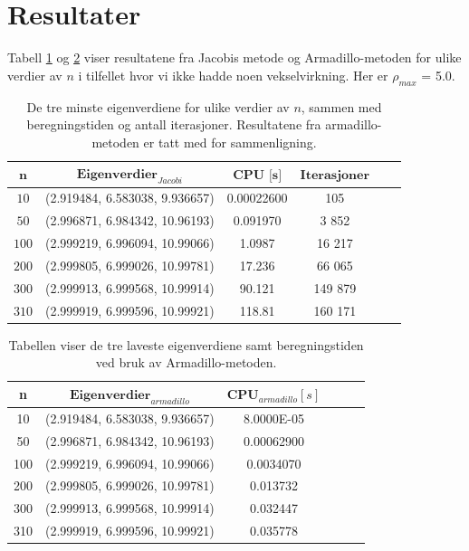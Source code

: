 \documentclass{article}
\begin{document}
\section{Resultater}
Tabell \ref{tab:jacobi} og \ref{tab:armadillo} viser resultatene fra Jacobis metode og Armadillo-metoden for ulike verdier av $n$ i tilfellet hvor vi ikke hadde noen vekselvirkning. Her er $\rho_{max}$ = 5.0.

\FloatBarrier
\begin{table}[!ht]
\centering
\caption{De tre minste eigenverdiene for ulike verdier av $n$, sammen med beregningstiden og antall iterasjoner. Resultatene fra armadillo-metoden er tatt med for sammenligning.}
\label{tab:jacobi}
\begin{tabular}{|c|c|c|c|c|c|}
\hline
$\textbf{n}$      &  $\textbf{Eigenverdier}_{Jacobi}$ & $\textbf{CPU [s]}$ & $\textbf{Iterasjoner}$ \\ 
\hline
$10$     & (2.919484, 6.583038, 9.936657) &  0.00022600 & 105               \\ 
\hline
$50$ & (2.996871, 6.984342, 10.96193)     & 0.091970     & 3 852             \\ 
\hline
$100$ & (2.999219, 6.996094, 10.99066)     & 1.0987      & 16 217         \\ 
\hline
$200$ & (2.999805, 6.999026, 10.99781)     & 17.236     & 66 065             \\ 
\hline
$300$ & (2.999913, 6.999568, 10.99914)     & 90.121    & 149 879               \\ 
\hline
$310$ & (2.999919, 6.999596, 10.99921)     &  118.81   & 160 171     \\ 
\hline       
\end{tabular}
\end{table}
\FloatBarrier

\FloatBarrier
\begin{table}[!ht]
\centering
\caption{Tabellen viser de tre laveste eigenverdiene samt beregningstiden ved bruk av Armadillo-metoden.}
\label{tab:armadillo}
\begin{tabular}{|c|c|c|c|c|c|}
\hline
\textbf{n}     &  $\textbf{Eigenverdier}_{armadillo}$  &  $\textbf{CPU}_{armadillo} [s]$  \\ 
\hline
10     & (2.919484,   6.583038,   9.936657)  &8.0000E-05     \\ 
\hline
50 & (2.996871, 6.984342, 10.96193)  &     0.00062900        \\ 
\hline
100 & (2.999219, 6.996094, 10.99066)  & 0.0034070         \\ 
\hline
200 & (2.999805, 6.999026, 10.99781)  & 0.013732     \\ 
\hline   
300 & (2.999913, 6.999568, 10.99914) & 0.032447      \\ 
\hline   
310 & (2.999919, 6.999596, 10.99921)  & 0.035778     \\ 
\hline   
\end{tabular}
\end{table}
\FloatBarrier
\end{document}
